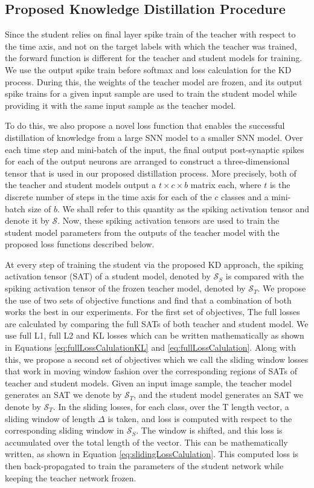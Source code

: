 \documentclass{article}
\begin{document}
\subsection{Proposed Knowledge Distillation Procedure}
Since the student relies on final layer spike train of the teacher with respect to the time axis, and not on the target labels with which the teacher was trained, the forward function is different for the teacher and student models for training. We use the output spike train before softmax and loss calculation for the KD process. During this, the weights of the teacher model are frozen, and its output spike trains for a given input sample are used to train the student model while providing it with the same input sample as the teacher model.

To do this, we also propose a novel loss function that enables the successful distillation of knowledge from a large SNN model to a smaller SNN model. Over each time step and mini-batch of the input, the final output post-synaptic spikes for each of the output neurons are arranged to construct a three-dimensional tensor that is used in our proposed distillation process. More precisely, both of the teacher and student models output a $t \times c \times b$ matrix each, where $t$ is the discrete number of steps in the time axis for each of the $c$ classes and a mini-batch size of $b$. We shall refer to this quantity as the spiking activation tensor and denote it by $\mathcal{S}$. Now, these spiking activation tensors are used to train the student model parameters from the outputs of the teacher model with the proposed loss functions described below.

At every step of training the student via the proposed KD approach, the spiking activation tensor (SAT) of a student model, denoted by $\mathcal{S}_{S}$ is compared with the spiking activation tensor of the frozen teacher model, denoted by $\mathcal{S}_{T}$. We propose the use of two sets of objective functions and find that a combination of both works the best in our experiments. For the first set of objectives, The full losses are calculated by comparing the full SATs of both teacher and student model. We use full L1, full L2 and KL losses which can be written mathematically as shown in Equations \ref{eq:fullLossCalulationKL} and \ref{eq:fullLossCalulation}. Along with this, we propose a second set of objectives which we call the sliding window losses that work in moving window fashion over the corresponding regions of SATs of teacher and student models. Given an input image sample, the teacher model generates an SAT we denote by $\mathcal{S}_{T}$, and the student model generates an SAT we denote by $\mathcal{S}_{T}$. In the sliding losses, for each class, over the T length vector, a sliding window of length $\Delta$ is taken, and loss is computed with respect to the corresponding sliding window in $\mathcal{S}_{S}$. The window is shifted, and this loss is accumulated over the total length of the vector. This can be mathematically written, as shown in Equation \ref{eq:slidingLossCalulation}. This computed loss is then back-propagated to train the parameters of the student network while keeping the teacher network frozen.
\end{document}
